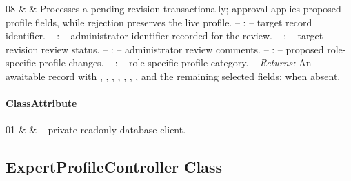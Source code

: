 \begin{ClassMethodTable}
08 & \newline{}\newline{}\newline{}\newline{}\newline{}\newline{} &
Processes a pending revision transactionally; approval applies proposed profile fields, while rejection preserves the live profile.
\newline -- :  -- target record identifier.
\newline -- :  -- administrator identifier recorded for the review.
\newline -- :  -- target revision review status.
\newline -- :  -- administrator review comments.
\newline -- :  -- proposed role-specific profile changes.
\newline -- :  -- role-specific profile category.
\newline -- \textit{Returns:} An awaitable record with , , , , , , , and the remaining selected fields;  when absent.
 \\ \hline

\end{ClassMethodTable}

\paragraph{ClassAttribute}
\begin{ClassAttributeTable}
01 &  &  -- private readonly database client. \\ \hline
\end{ClassAttributeTable}

\subsection{ExpertProfileController Class}
\label{cls:nhuy-ExpertProfileController}

